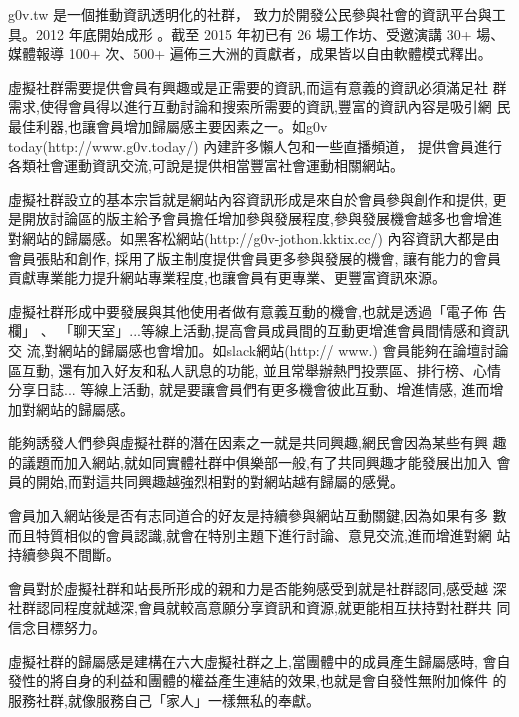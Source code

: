 g0v.tw 是一個推動資訊透明化的社群，
致力於開發公民參與社會的資訊平台與工具。2012 年底開始成形
。截至 2015 年初已有 26 場工作坊、受邀演講 30+ 場、媒體報導 100+ 次、500+ 遍佈三大洲的貢獻者，成果皆以自由軟體模式釋出。





虛擬社群需要提供會員有興趣或是正需要的資訊,而這有意義的資訊必須滿足社
群需求,使得會員得以進行互動討論和搜索所需要的資訊,豐富的資訊內容是吸引網
民最佳利器,也讓會員增加歸屬感主要因素之一。如g0v today(http://www.g0v.today/) 內建許多懶人包和一些直播頻道， 
提供會員進行各類社會運動資訊交流,可說是提供相當豐富社會運動相關網站。




虛擬社群設立的基本宗旨就是網站內容資訊形成是來自於會員參與創作和提供,
更是開放討論區的版主給予會員擔任增加參與發展程度,參與發展機會越多也會增進
對網站的歸屬感。如黑客松網站(http://g0v-jothon.kktix.cc/) 內容資訊大都是由會員張貼和創作, 採用了版主制度提供會員更多參與發展的機會, 
讓有能力的會員貢獻專業能力提升網站專業程度,也讓會員有更專業、更豐富資訊來源。




虛擬社群形成中要發展與其他使用者做有意義互動的機會,也就是透過「電子佈
告欄」
、
「聊天室」...等線上活動,提高會員成員間的互動更增進會員間情感和資訊交
流,對網站的歸屬感也會增加。如slack網站(http://
www.) 會員能夠在論壇討論區互動, 還有加入好友和私人訊息的功能, 
並且常舉辦熱門投票區、排行榜、心情分享日誌... 等線上活動, 
就是要讓會員們有更多機會彼此互動、增進情感, 進而增加對網站的歸屬感。






能夠誘發人們參與虛擬社群的潛在因素之一就是共同興趣,網民會因為某些有興
趣的議題而加入網站,就如同實體社群中俱樂部一般,有了共同興趣才能發展出加入
會員的開始,而對這共同興趣越強烈相對的對網站越有歸屬的感覺。







會員加入網站後是否有志同道合的好友是持續參與網站互動關鍵,因為如果有多
數而且特質相似的會員認識,就會在特別主題下進行討論、意見交流,進而增進對網
站持續參與不間斷。







會員對於虛擬社群和站長所形成的親和力是否能夠感受到就是社群認同,感受越
深社群認同程度就越深,會員就較高意願分享資訊和資源,就更能相互扶持對社群共
同信念目標努力。



虛擬社群的歸屬感是建構在六大虛擬社群之上,當團體中的成員產生歸屬感時,
會自發性的將自身的利益和團體的權益產生連結的效果,也就是會自發性無附加條件
的服務社群,就像服務自己「家人」一樣無私的奉獻。




\EndChapter


